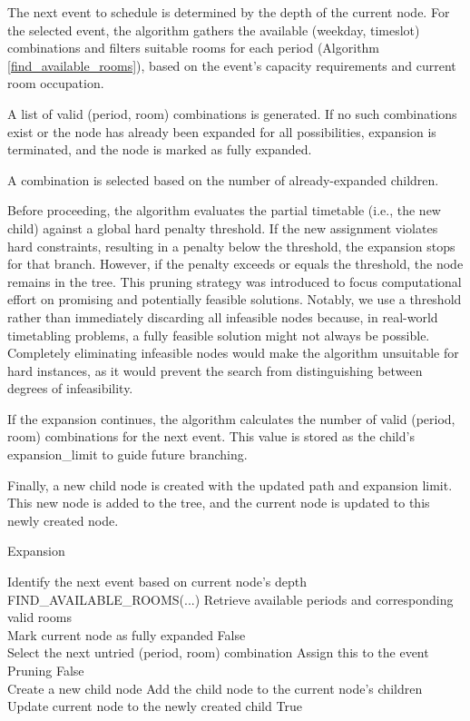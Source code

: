 The next event to schedule is determined by the depth of the current node. For the selected event, the algorithm gathers the available (weekday, timeslot) combinations and filters suitable rooms for each period (Algorithm \ref{find_available_rooms}), based on the event’s capacity requirements and current room occupation.

A list of valid (period, room) combinations is generated. If no such combinations exist or the node has already been expanded for all possibilities, expansion is terminated, and the node is marked as fully expanded.  

A combination is selected based on the number of already-expanded children. %

Before proceeding, the algorithm evaluates the partial timetable (i.e., the new child) against a global hard penalty threshold. If the new assignment violates hard constraints, resulting in a penalty below the threshold, the expansion stops for that branch. However, if the penalty exceeds or equals the threshold, the node remains in the tree. This pruning strategy was introduced to focus computational effort on promising and potentially feasible solutions. Notably, we use a threshold rather than immediately discarding all infeasible nodes because, in real-world timetabling problems, a fully feasible solution might not always be possible. Completely eliminating infeasible nodes would make the algorithm unsuitable for hard instances, as it would prevent the search from distinguishing between degrees of infeasibility.

If the expansion continues, the algorithm calculates the number of valid (period, room) combinations for the next event. This value is stored as the child’s expansion\_limit to guide future branching.

Finally, a new child node is created with the updated path and expansion limit. This new node is added to the tree, and the current node is updated to this newly created node.

\begin{algorithm}
\caption{Expansion}\label{expansion}
\begin{algorithmic}[1]
	\State Identify the next event based on current node’s depth
	\State FIND\_AVAILABLE\_ROOMS(...) \Comment Retrieve available periods and corresponding valid rooms 
\\
		\State Mark current node as fully expanded
		\State \Return False
	\EndIf
\\
	\State Select the next untried (period, room) combination
	\State Assign this to the event
\\
		\State Pruning
		\State \Return False
	\EndIf
\\
	\State Create a new child node
	\State Add the child node to the current node’s children
	\State Update current node to the newly created child
	\State \Return True    
\EndFunction
\end{algorithmic}
\end{algorithm}

